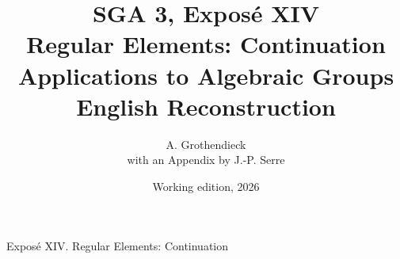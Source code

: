 \documentclass[11pt,a4paper,oneside,leqno]{book}
\title{SGA 3, Exposé XIV\\Regular Elements: Continuation\\
Applications to Algebraic Groups\\English Reconstruction}
\author{A. Grothendieck\\with an Appendix by J.-P. Serre}
\date{Working edition, 2026}
\begin{document}
\frontmatter
\maketitle
\tableofcontents
\mainmatter

  {Exposé XIV. Regular Elements: Continuation}































\end{document}

